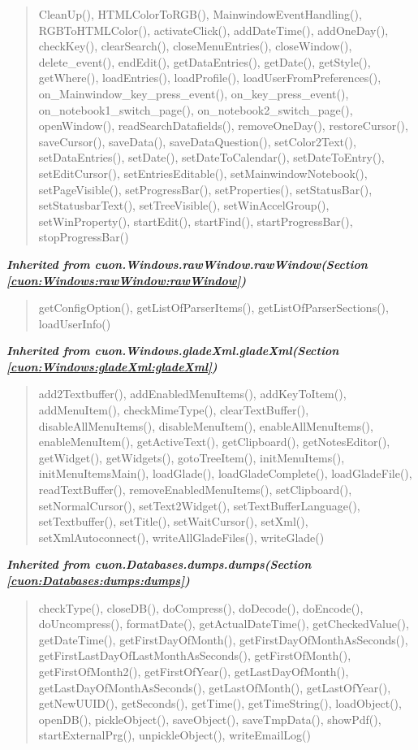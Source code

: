 \begin{quote}
CleanUp(), HTMLColorToRGB(), MainwindowEventHandling(), RGBToHTMLColor(), activateClick(), addDateTime(), addOneDay(), checkKey(), clearSearch(), closeMenuEntries(), closeWindow(), delete\_event(), endEdit(), getDataEntries(), getDate(), getStyle(), getWhere(), loadEntries(), loadProfile(), loadUserFromPreferences(), on\_Mainwindow\_key\_press\_event(), on\_key\_press\_event(), on\_notebook1\_switch\_page(), on\_notebook2\_switch\_page(), openWindow(), readSearchDatafields(), removeOneDay(), restoreCursor(), saveCursor(), saveData(), saveDataQuestion(), setColor2Text(), setDataEntries(), setDate(), setDateToCalendar(), setDateToEntry(), setEditCursor(), setEntriesEditable(), setMainwindowNotebook(), setPageVisible(), setProgressBar(), setProperties(), setStatusBar(), setStatusbarText(), setTreeVisible(), setWinAccelGroup(), setWinProperty(), startEdit(), startFind(), startProgressBar(), stopProgressBar()
\end{quote}

\large{\textbf{\textit{Inherited from cuon.Windows.rawWindow.rawWindow\textit{(Section \ref{cuon:Windows:rawWindow:rawWindow})}}}}

\begin{quote}
getConfigOption(), getListOfParserItems(), getListOfParserSections(), loadUserInfo()
\end{quote}

\large{\textbf{\textit{Inherited from cuon.Windows.gladeXml.gladeXml\textit{(Section \ref{cuon:Windows:gladeXml:gladeXml})}}}}

\begin{quote}
add2Textbuffer(), addEnabledMenuItems(), addKeyToItem(), addMenuItem(), checkMimeType(), clearTextBuffer(), disableAllMenuItems(), disableMenuItem(), enableAllMenuItems(), enableMenuItem(), getActiveText(), getClipboard(), getNotesEditor(), getWidget(), getWidgets(), gotoTreeItem(), initMenuItems(), initMenuItemsMain(), loadGlade(), loadGladeComplete(), loadGladeFile(), readTextBuffer(), removeEnabledMenuItems(), setClipboard(), setNormalCursor(), setText2Widget(), setTextBufferLanguage(), setTextbuffer(), setTitle(), setWaitCursor(), setXml(), setXmlAutoconnect(), writeAllGladeFiles(), writeGlade()
\end{quote}

\large{\textbf{\textit{Inherited from cuon.Databases.dumps.dumps\textit{(Section \ref{cuon:Databases:dumps:dumps})}}}}

\begin{quote}
checkType(), closeDB(), doCompress(), doDecode(), doEncode(), doUncompress(), formatDate(), getActualDateTime(), getCheckedValue(), getDateTime(), getFirstDayOfMonth(), getFirstDayOfMonthAsSeconds(), getFirstLastDayOfLastMonthAsSeconds(), getFirstOfMonth(), getFirstOfMonth2(), getFirstOfYear(), getLastDayOfMonth(), getLastDayOfMonthAsSeconds(), getLastOfMonth(), getLastOfYear(), getNewUUID(), getSeconds(), getTime(), getTimeString(), loadObject(), openDB(), pickleObject(), saveObject(), saveTmpData(), showPdf(), startExternalPrg(), unpickleObject(), writeEmailLog()
\end{quote}

